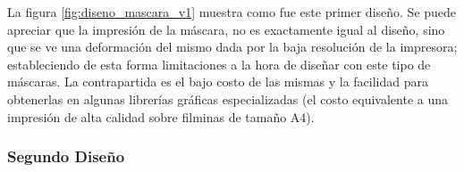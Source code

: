 		      La figura \ref{fig:diseno_mascara_v1} muestra como fue este primer diseño. Se puede apreciar que la impresión de la máscara, no es exactamente igual al diseño, sino que se ve una deformación del mismo dada por la baja resolución de la impresora; estableciendo de esta forma limitaciones a la hora de diseñar con este tipo de máscaras. La contrapartida es el bajo costo de las mismas y la facilidad para obtenerlas en algunas librerías gráficas especializadas (el costo equivalente a una impresión de alta calidad sobre filminas de tamaño A4).
		
 		 \subsubsection{Segundo Diseño}

